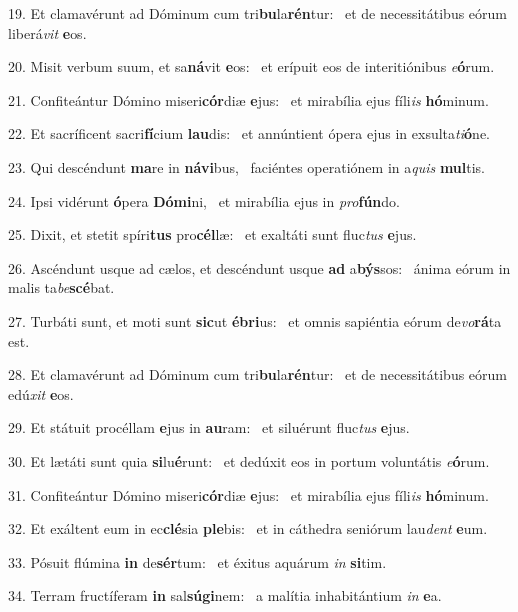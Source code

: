 19. Et clamavérunt ad Dóminum cum tri\textbf{bu}la\textbf{rén}tur: \ast\  et de necessitátibus eórum liberá\textit{vit} \textbf{e}os.\

20. Misit verbum suum, et sa\textbf{ná}vit \textbf{e}os: \ast\  et erípuit eos de interitiónibus \textit{e}\textbf{ó}rum.\

21. Confiteántur Dómino miseri\textbf{cór}diæ \textbf{e}jus: \ast\  et mirabília ejus fíli\textit{is} \textbf{hó}minum.\

22. Et sacríficent sacri\textbf{fí}cium \textbf{lau}dis: \ast\  et annúntient ópera ejus in exsulta\textit{ti}\textbf{ó}ne.\

23. Qui descéndunt \textbf{ma}re in \textbf{ná}\textbf{vi}bus, \ast\  faciéntes operatiónem in a\textit{quis} \textbf{mul}tis.\

24. Ipsi vidérunt \textbf{ó}pera \textbf{Dó}\textbf{mi}ni, \ast\  et mirabília ejus in \textit{pro}\textbf{fún}do.\

25. Dixit, et stetit spíri\textbf{tus} pro\textbf{cél}læ: \ast\  et exaltáti sunt fluc\textit{tus} \textbf{e}jus.\

26. Ascéndunt usque ad cælos, et descéndunt usque \textbf{ad} a\textbf{býs}sos: \ast\  ánima eórum in malis ta\textit{be}\textbf{scé}bat.\

27. Turbáti sunt, et moti sunt \textbf{sic}ut \textbf{é}\textbf{bri}us: \ast\  et omnis sapiéntia eórum de\textit{vo}\textbf{rá}ta est.\

28. Et clamavérunt ad Dóminum cum tri\textbf{bu}la\textbf{rén}tur: \ast\  et de necessitátibus eórum edú\textit{xit} \textbf{e}os.\

29. Et státuit procéllam \textbf{e}jus in \textbf{au}ram: \ast\  et siluérunt fluc\textit{tus} \textbf{e}jus.\

30. Et lætáti sunt quia \textbf{si}lu\textbf{é}runt: \ast\  et dedúxit eos in portum voluntátis \textit{e}\textbf{ó}rum.\

31. Confiteántur Dómino miseri\textbf{cór}diæ \textbf{e}jus: \ast\  et mirabília ejus fíli\textit{is} \textbf{hó}minum.\

32. Et exáltent eum in ec\textbf{clé}sia \textbf{ple}bis: \ast\  et in cáthedra seniórum lau\textit{dent} \textbf{e}um.\

33. Pósuit flúmina \textbf{in} de\textbf{sér}tum: \ast\  et éxitus aquárum \textit{in} \textbf{si}tim.\

34. Terram fructíferam \textbf{in} sal\textbf{sú}\textbf{gi}nem: \ast\  a malítia inhabitántium \textit{in} \textbf{e}a.\

